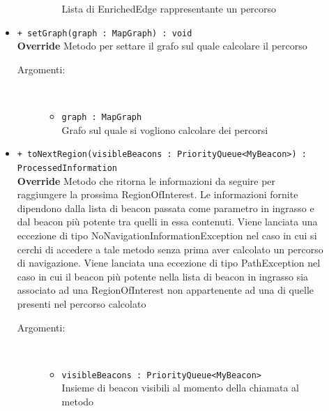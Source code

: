 \documentclass[../DefinizioneDiProdotto.tex]{subfiles}
\begin{document}
\begin{description}
\begin{itemize}
\begin{description}
\begin{itemize}
				Lista di EnrichedEdge rappresentante un percorso\end{itemize}
		\end{description}
		\item \texttt{+ setGraph(graph : MapGraph) : void}\\
		\textbf{Override} Metodo per settare il grafo sul quale calcolare il percorso
		\begin{description}
			\item[Argomenti:] \
			\begin{itemize}
				\item \texttt{graph : MapGraph}\\
				Grafo sul quale si vogliono calcolare dei percorsi\end{itemize}
		\end{description}
		\item \texttt{+ toNextRegion(visibleBeacons : PriorityQueue<MyBeacon>) : ProcessedInformation}\\
		\textbf{Override} Metodo che ritorna le informazioni da seguire per raggiungere la prossima RegionOfInterest. Le informazioni fornite dipendono dalla lista di beacon passata come parametro in ingrasso e dal beacon più potente tra quelli in essa contenuti. Viene lanciata una eccezione di tipo NoNavigationInformationException nel caso in cui si cerchi di accedere a tale metodo senza prima aver calcolato un percorso di navigazione. Viene lanciata una eccezione di tipo PathException nel caso in cui il beacon più potente nella lista di beacon in ingrasso sia associato ad una RegionOfInterest non appartenente ad una di quelle presenti nel percorso calcolato
		\begin{description}
			\item[Argomenti:] \
			\begin{itemize}
				\item \texttt{visibleBeacons : PriorityQueue<MyBeacon>}\\
				Insieme di beacon visibili al momento della chiamata al metodo\end{itemize}
		\end{description}
	\end{itemize}
\end{description}
\end{document}
